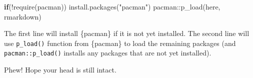 \documentclass[
  letterpaper,
  DIV=11,
  numbers=noendperiod]{scrreprt}
\newenvironment{Shaded}{\begin{snugshade}}{\end{snugshade}}
\newcommand{\ControlFlowTok}[1]{\textcolor[rgb]{0.00,0.23,0.31}{\textbf{#1}}}
\newcommand{\FunctionTok}[1]{\textcolor[rgb]{0.28,0.35,0.67}{#1}}
\newcommand{\NormalTok}[1]{\textcolor[rgb]{0.00,0.23,0.31}{#1}}
\newcommand{\SpecialCharTok}[1]{\textcolor[rgb]{0.37,0.37,0.37}{#1}}
\newcommand{\StringTok}[1]{\textcolor[rgb]{0.13,0.47,0.30}{#1}}
\begin{document}
\begin{Shaded}
\begin{Highlighting}[]
\ControlFlowTok{if}\NormalTok{(}\SpecialCharTok{!}\FunctionTok{require}\NormalTok{(pacman)) }\FunctionTok{install.packages}\NormalTok{(}\StringTok{"pacman"}\NormalTok{)}
\NormalTok{pacman}\SpecialCharTok{::}\FunctionTok{p\_load}\NormalTok{(here, rmarkdown)}
\end{Highlighting}
\end{Shaded}

The first line will install \{pacman\} if it is not yet installed. The
second line will use \texttt{p\_load()} function from \{pacman\} to load
the remaining packages (and \texttt{pacman::p\_load()} installs any
packages that are not yet installed).

Phew! Hope your head is still intact.
\end{document}
